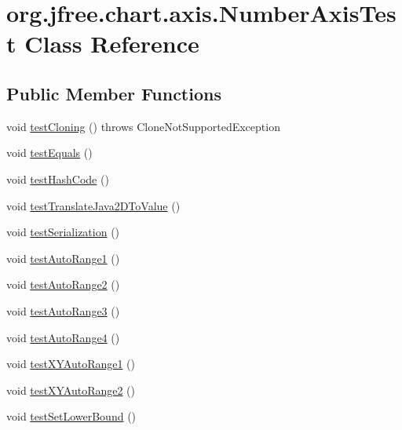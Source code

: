 \hypertarget{classorg_1_1jfree_1_1chart_1_1axis_1_1_number_axis_test}{}\section{org.\+jfree.\+chart.\+axis.\+Number\+Axis\+Test Class Reference}
\label{classorg_1_1jfree_1_1chart_1_1axis_1_1_number_axis_test}
\subsection*{Public Member Functions}
\begin{DoxyCompactItemize}
\item 
void \mbox{\hyperlink{classorg_1_1jfree_1_1chart_1_1axis_1_1_number_axis_test_a51bd84f770df5d194217d0ce2f5669f6}{test\+Cloning}} ()  throws Clone\+Not\+Supported\+Exception 
\item 
void \mbox{\hyperlink{classorg_1_1jfree_1_1chart_1_1axis_1_1_number_axis_test_a16f75ea86bd471ae1fc7e0decba3c436}{test\+Equals}} ()
\item 
void \mbox{\hyperlink{classorg_1_1jfree_1_1chart_1_1axis_1_1_number_axis_test_adae6ac62cf8b4e8846ffcb8e3451dc83}{test\+Hash\+Code}} ()
\item 
void \mbox{\hyperlink{classorg_1_1jfree_1_1chart_1_1axis_1_1_number_axis_test_a13766ad9b81e449355704c7c7c0658d6}{test\+Translate\+Java2\+D\+To\+Value}} ()
\item 
void \mbox{\hyperlink{classorg_1_1jfree_1_1chart_1_1axis_1_1_number_axis_test_abf373e7d93bb1447a14c4865a93d5c35}{test\+Serialization}} ()
\item 
void \mbox{\hyperlink{classorg_1_1jfree_1_1chart_1_1axis_1_1_number_axis_test_aa82eb6b8c2cee6c8ae36ebce678f85b6}{test\+Auto\+Range1}} ()
\item 
void \mbox{\hyperlink{classorg_1_1jfree_1_1chart_1_1axis_1_1_number_axis_test_a3e2c6866e6a2433083d9156ef6e78388}{test\+Auto\+Range2}} ()
\item 
void \mbox{\hyperlink{classorg_1_1jfree_1_1chart_1_1axis_1_1_number_axis_test_ab76758f65d24e8ff04e4aec7c68c3680}{test\+Auto\+Range3}} ()
\item 
void \mbox{\hyperlink{classorg_1_1jfree_1_1chart_1_1axis_1_1_number_axis_test_a0048f83c150cbfee0c04dc683fb750ee}{test\+Auto\+Range4}} ()
\item 
void \mbox{\hyperlink{classorg_1_1jfree_1_1chart_1_1axis_1_1_number_axis_test_ad165f862a258170f8b6378412545cd7c}{test\+X\+Y\+Auto\+Range1}} ()
\item 
void \mbox{\hyperlink{classorg_1_1jfree_1_1chart_1_1axis_1_1_number_axis_test_a61aa9dad6b0aafd8b967fb15e2f7924a}{test\+X\+Y\+Auto\+Range2}} ()
\item 
void \mbox{\hyperlink{classorg_1_1jfree_1_1chart_1_1axis_1_1_number_axis_test_a86674de981f45c1138c657a9a99803d9}{test\+Set\+Lower\+Bound}} ()
\end{DoxyCompactItemize}


